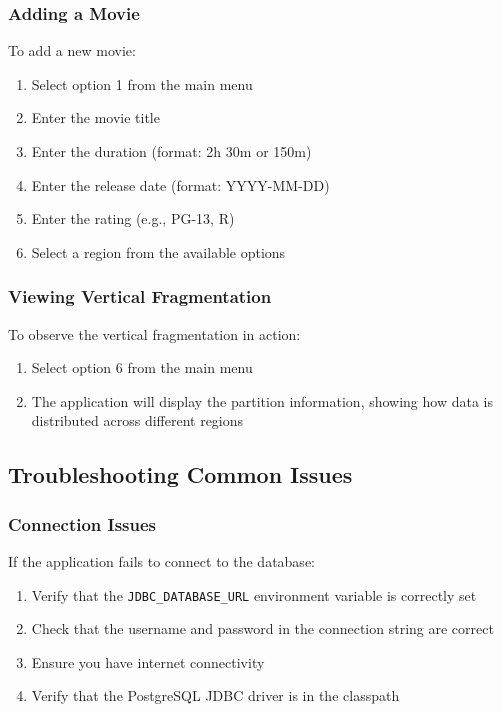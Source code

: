 \documentclass[twoside]{article}
\begin{document}
\subsubsection{Adding a Movie}

To add a new movie:
\begin{enumerate}
  \item Select option 1 from the main menu
  \item Enter the movie title
  \item Enter the duration (format: 2h 30m or 150m)
  \item Enter the release date (format: YYYY-MM-DD)
  \item Enter the rating (e.g., PG-13, R)
  \item Select a region from the available options
\end{enumerate}

\subsubsection{Viewing Vertical Fragmentation}

To observe the vertical fragmentation in action:
\begin{enumerate}
  \item Select option 6 from the main menu
  \item The application will display the partition information, showing how data is distributed across different regions
\end{enumerate}

\subsection{Troubleshooting Common Issues}

\subsubsection{Connection Issues}

If the application fails to connect to the database:
\begin{enumerate}
  \item Verify that the \texttt{JDBC\_DATABASE\_URL} environment variable is correctly set
  \item Check that the username and password in the connection string are correct
  \item Ensure you have internet connectivity
  \item Verify that the PostgreSQL JDBC driver is in the classpath
\end{enumerate}
\end{document}
